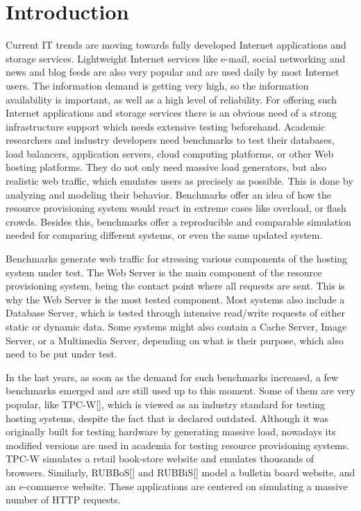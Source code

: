 \chapter{Introduction}
\label{chapter:chapter1}

Current IT trends are moving towards fully developed Internet applications and storage services. Lightweight Internet services like e-mail, social networking and news and blog feeds are also very popular and are used daily by most Internet users. The information demand is getting very high, so the information availability is important, as well as a high level of reliability. For offering such Internet applications and storage services there is an obvious need of a strong infrastructure support which needs extensive testing beforehand. Academic researchers and industry developers need benchmarks to test their databases, load balancers, application servers, cloud computing platforms, or other Web hosting platforms. They do not only need massive load generators, but also realistic web traffic, which emulates users as precisely as possible. This is done by analyzing and modeling their behavior. Benchmarks offer an idea of how the resource provisioning system would react in extreme cases like overload, or flash crowds. Besides this, benchmarks offer a reproducible and comparable simulation needed for comparing different systems, or even the same updated system.

Benchmarks generate web traffic for stressing various components of the hosting system under test. The Web Server is the main component of the resource provisioning system, being the contact point where all requests are sent. This is why the Web Server is the most tested component. Most systems also include a Database Server, which is tested through intensive read/write requests of either static or dynamic data.  Some systems might also contain a Cache Server, Image Server, or a Multimedia Server, depending on what is their purpose, which also need to be put under test.

In the last years, as soon as the demand for such benchmarks increased, a few benchmarks emerged and are still used up to this moment. Some of them are very popular, like TPC-W[], which is viewed as an industry standard for testing hosting systems, despite the fact that is declared outdated. Although it was originally built for testing hardware by generating massive load, nowadays its modified versions are used in academia for testing resource provisioning systems.  TPC-W simulates a retail book-store website and emulates thousands of browsers. Similarly, RUBBoS[] and RUBBiS[] model a bulletin board website, and an e-commerce website. These applications are centered on simulating a massive number of HTTP requests.

